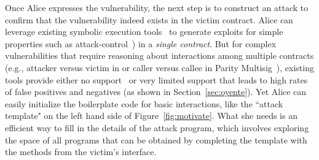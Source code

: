 Once Alice expresses the \reentrancy vulnerability, the next step is to
construct an attack to confirm that the vulnerability indeed exists in the
victim contract. Alice can leverage existing symbolic execution
tools~\cite{mythril,oyente,teether} to generate exploits for simple properties such as 
attack-control~\cite{teether}) in a \emph{single contract}. But for
complex vulnerabilities that require reasoning about interactions among multiple
contracts (e.g., attacker versus victim in \reentrancy or caller versus callee in
Parity Multisig~\cite{multisig}), existing tools provide either no 
support~\cite{teether} or very limited support that 
leads to high rates~\cite{oyente} of false positives and negatives (as shown in
Section~\ref{sec:oyente}). %
Yet Alice can easily initialize the boilerplate code
for basic interactions, like the ``attack template" on the left hand side of
Figure~\ref{fig:motivate}. What she needs is an efficient way to  
fill in the details of the attack program, which involves exploring the space 
of all programs that can be obtained by completing the template with the methods 
from the victim's interface.

